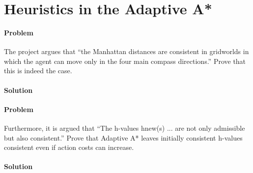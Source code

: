 \section{Heuristics in the Adaptive A*}

\paragraph{Problem}
The project argues that “the Manhattan distances are consistent in gridworlds
in which the agent can move only in the four main compass directions.” Prove
that this is indeed the case.

\paragraph{Solution}

\paragraph{Problem}
Furthermore, it is argued that “The h-values hnew(s) ... are not only
admissible but also consistent.” Prove that Adaptive A* leaves initially
consistent h-values consistent even if action costs can increase.

\paragraph{Solution}
